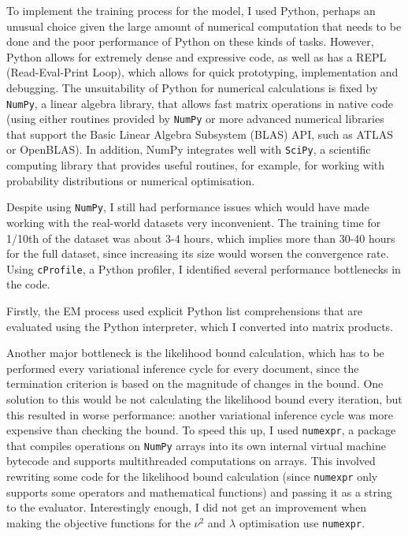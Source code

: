\documentclass[12pt,a4paper,twoside,openright]{report}
\begin{document}
To implement the training process for the model, I used Python, perhaps an unusual choice given the large amount of numerical computation that needs to be done and the poor performance of Python on these kinds of tasks. However, Python allows for extremely dense and expressive code, as well as has a REPL (Read-Eval-Print Loop), which allows for quick prototyping, implementation and debugging. The unsuitability of Python for numerical calculations is fixed by \texttt{NumPy}, a linear algebra library, that allows fast matrix operations in native code (using either routines provided by \texttt{NumPy} or more advanced numerical libraries that support the Basic Linear Algebra Subsystem (BLAS) API, such as ATLAS or OpenBLAS). In addition, NumPy integrates well with \texttt{SciPy}, a scientific computing library that provides useful routines, for example, for working with probability distributions or numerical optimisation.

Despite using \texttt{NumPy}, I still had performance issues which would have made working with the real-world datasets very inconvenient. The training time for 1/10th of the dataset was about 3-4 hours, which implies more than 30-40 hours for the full dataset, since increasing its size would worsen the convergence rate. Using \texttt{cProfile}, a Python profiler, I identified several performance bottlenecks in the code.

Firstly, the EM process used explicit Python list comprehensions that are evaluated using the Python interpreter, which I converted into matrix products.

Another major bottleneck is the likelihood bound calculation, which has to be performed every variational inference cycle for every document, since the termination criterion is based on the magnitude of changes in the bound. One solution to this would be not calculating the likelihood bound every iteration, but this resulted in worse performance: another variational inference cycle was more expensive than checking the bound. To speed this up, I used \texttt{numexpr}, a package that compiles operations on \texttt{NumPy} arrays into its own internal virtual machine bytecode and supports multithreaded computations on arrays. This involved rewriting some code for the likelihood bound calculation (since \texttt{numexpr} only supports some operators and mathematical functions) and passing it as a string to the evaluator. Interestingly enough, I did not get an improvement when making the objective functions for the $\nu^2$ and $\lambda$ optimisation use \texttt{numexpr}.
\end{document}

